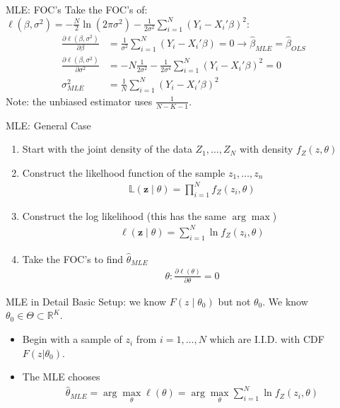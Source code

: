 \begin{frame}{MLE: FOC's}
Take the FOC's of: 
$\ell(\beta,\sigma^2) = -\frac{N}{2} \ln (2 \pi \sigma^2) - \frac{1}{2 \sigma^2} \sum_{i=1}^N(Y_i - X_i' \beta)^2
$:
\begin{align*} 
\frac{ \partial \ell(\beta,\sigma^2) }{\partial \beta}&= \frac{1}{ \sigma^2}\sum_{i=1}^N(Y_i - X_i' \beta) = 0 \rightarrow \widehat{\beta}_{MLE}= \widehat{\beta}_{OLS}\\ 
\frac{ \partial \ell(\beta,\sigma^2) }{\partial \sigma^2}&= -N \frac{1}{2 \sigma^2}  -  \frac{1}{2 \sigma^4} \sum_{i=1}^N(Y_i - X_i' \beta)^2 = 0 \\
\sigma^2_{MLE} &= \frac{1}{N} \sum_{i=1}^N (Y_i - X_i' \beta)^2
\end{align*}
Note: the unbiased estimator uses $\frac{1}{N-K-1}$.
\end{frame}

\begin{frame}{MLE: General Case}
\begin{enumerate}
\item Start with the \alert{joint density of the data} $Z_1,\ldots,Z_N$ with density $f_Z(z,\theta)$
\item Construct the likelhood function of the sample $z_1,\ldots,z_n$
\begin{align*}
\mathbb{L}(\mathbf{z} \mid  \theta) = \prod_{i=1}^N f_Z(z_i,\theta)
\end{align*}
\item Construct the \alert{log likelihood} (this has the same $\arg \max$)
\begin{align*}
\ell(\mathbf{z} \mid \theta) = \sum_{i=1}^N \ln f_Z(z_i,\theta)
\end{align*}
\item Take the FOC's to find $\widehat{\theta}_{MLE}$
\begin{align*}
\theta : \frac{\partial \ell(\theta)}{\partial \theta} =0
\end{align*}
\end{enumerate}
\end{frame}

\begin{frame}{MLE in Detail}
Basic Setup: we know $F(z \mid \theta_0)$ but not $\theta_0$. We know $\theta_0 \in \Theta \subset \mathbb{R}^K$.
\begin{itemize}
\item Begin with a sample of $z_i$ from $i=1,\ldots,N$ which are I.I.D. with CDF $F(z|\theta_0)$.
\item The MLE chooses
\begin{align*}
\widehat{\theta}_{MLE} = \arg \max_{\theta} \ell(\theta) = \arg \max_{\theta} \sum_{i=1}^N \ln f_Z(z_i,\theta)
\end{align*}
\end{itemize}
\end{frame}


